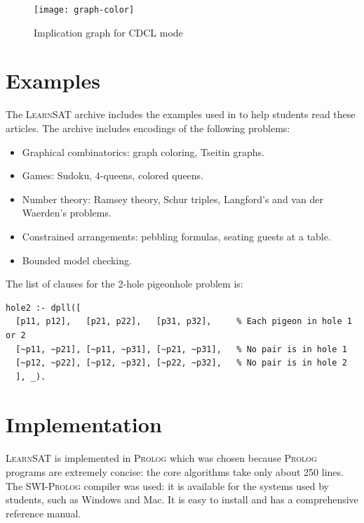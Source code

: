 \documentclass[11pt]{article}
\newcommand*{\ls}{\textsc{LearnSAT}}
\newcommand*{\pl}{\textsc{Prolog}}
\newcommand*{\sw}{\textsc{SWI-Prolog}}
\begin{document}
\begin{figure}
\vspace*{-2ex}
\begin{center}
\texttt{[image: graph-color]}
\caption{Implication graph for CDCL mode}\label{fig.2}
\end{center}
\end{figure}

\section{Examples}

The \ls{} archive includes the examples used in \cite{mz,mlm,ms} to help students read these articles. The archive includes encodings of the following problems:
\begin{itemize}
\item Graphical combinatorics: graph coloring, Tseitin graphs.
\item Games: Sudoku, $4$-queens, colored queens.
\item Number theory: Ramsey theory, Schur triples, Langford's and van der Waerden's problems.
\item Constrained arrangements: pebbling formulas, seating guests at a table.
\item Bounded model checking.
\end{itemize}

\newpage

The list of clauses for the 2-hole pigeonhole problem is:
\begin{small}
\begin{verbatim}
hole2 :- dpll([
  [p11, p12],   [p21, p22],   [p31, p32],     % Each pigeon in hole 1 or 2
  [~p11, ~p21], [~p11, ~p31], [~p21, ~p31],   % No pair is in hole 1
  [~p12, ~p22], [~p12, ~p32], [~p22, ~p32],   % No pair is in hole 2
  ], _).
\end{verbatim}
\end{small}

\section{Implementation}

\ls{} is implemented in \pl{} which was chosen because \pl{} programs are extremely concise: the core algorithms take only about 250 lines. The \sw{} compiler was used: it is available for the systems used by students, such as Windows and Mac. It is easy to install and has a comprehensive reference manual.
\end{document}

